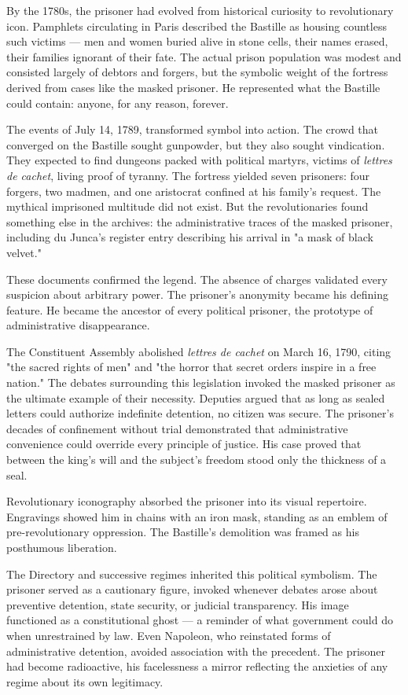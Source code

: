 By the 1780s, the prisoner had evolved from historical curiosity to revolutionary icon. Pamphlets circulating in Paris described the Bastille as housing countless such victims — men and women buried alive in stone cells, their names erased, their families ignorant of their fate. The actual prison population was modest and consisted largely of debtors and forgers, but the symbolic weight of the fortress derived from cases like the masked prisoner. He represented what the Bastille could contain: anyone, for any reason, forever.

The events of July 14, 1789, transformed symbol into action. The crowd that converged on the Bastille sought gunpowder, but they also sought vindication. They expected to find dungeons packed with political martyrs, victims of \textit{lettres de cachet}, living proof of tyranny. The fortress yielded seven prisoners: four forgers, two madmen, and one aristocrat confined at his family's request. The mythical imprisoned multitude did not exist. But the revolutionaries found something else in the archives: the administrative traces of the masked prisoner, including du Junca's register entry describing his arrival in "a mask of black velvet."

These documents confirmed the legend. The absence of charges validated every suspicion about arbitrary power. The prisoner's anonymity became his defining feature. He became the ancestor of every political prisoner, the prototype of administrative disappearance.

The Constituent Assembly abolished \textit{lettres de cachet} on March 16, 1790, citing "the sacred rights of men" and "the horror that secret orders inspire in a free nation." The debates surrounding this legislation invoked the masked prisoner as the ultimate example of their necessity. Deputies argued that as long as sealed letters could authorize indefinite detention, no citizen was secure. The prisoner's decades of confinement without trial demonstrated that administrative convenience could override every principle of justice. His case proved that between the king's will and the subject's freedom stood only the thickness of a seal.

Revolutionary iconography absorbed the prisoner into its visual repertoire. Engravings showed him in chains with an iron mask, standing as an emblem of pre-revolutionary oppression. The Bastille's demolition was framed as his posthumous liberation.

The Directory and successive regimes inherited this political symbolism. The prisoner served as a cautionary figure, invoked whenever debates arose about preventive detention, state security, or judicial transparency. His image functioned as a constitutional ghost — a reminder of what government could do when unrestrained by law. Even Napoleon, who reinstated forms of administrative detention, avoided association with the precedent. The prisoner had become radioactive, his facelessness a mirror reflecting the anxieties of any regime about its own legitimacy.

